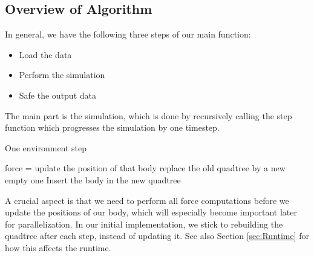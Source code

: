 \documentclass[a4paper]{scrartcl}
\begin{document}
    \subsection{Overview of Algorithm}
        In general, we have the following three steps of our main function:
        \begin{itemize}
            \item Load the data
            \item Perform the simulation
            \item Safe the output data
        \end{itemize}
        The main part is the simulation, which is done by recursively calling
        the step function which progresses the simulation by one timestep.
        \begin{algorithm}[H]
            \caption{One environment step}\label{alg:step}
            \begin{algorithmic}[1]
            \State force = 
            \EndFor
            \State update the position of that body
            \EndFor
            \State replace the old quadtree by a new empty one
            \State Insert the body in the new quadtree
            \EndFor
            \EndProcedure
            \end{algorithmic}
        \end{algorithm}
        A crucial aspect is that we need to perform all force computations
        before we update the positions of our body, which will especially become
        important later for parallelization. In our initial implementation, we
        stick to rebuilding the quadtree after each step, instead of updating
        it. See also Section \ref{sec:Runtime} for how this affects the runtime.
        
\end{document}
